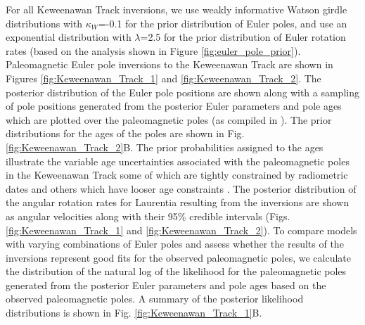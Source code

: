 \documentclass[]{agujournal2019}
\begin{document}
For all Keweenawan Track inversions, we use weakly informative Watson girdle distributions with $\kappa_W$=-0.1 for the prior distribution of Euler poles, and use an exponential distribution with $\lambda$=2.5 for the prior distribution of Euler rotation rates (based on the analysis shown in Figure \ref{fig:euler_pole_prior}). Paleomagnetic Euler pole inversions to the Keweenawan Track are shown in Figures \ref{fig:Keweenawan_Track_1} and \ref{fig:Keweenawan_Track_2}. The posterior distribution of the Euler pole positions are shown along with a sampling of pole positions generated from the posterior Euler parameters and pole ages which are plotted over the paleomagnetic poles (as compiled in ). The prior distributions for the ages of the poles are shown in Fig. \ref{fig:Keweenawan_Track_2}B. The prior probabilities assigned to the ages illustrate the variable age uncertainties associated with the paleomagnetic poles in the Keweenawan Track some of which are tightly constrained by radiometric dates and others which have looser age constraints \cite{Swanson-Hysell2019a}. The posterior distribution of the angular rotation rates for Laurentia resulting from the inversions are shown as angular velocities along with their 95\% credible intervals (Figs. \ref{fig:Keweenawan_Track_1} and \ref{fig:Keweenawan_Track_2}). To compare models with varying combinations of Euler poles and assess whether the results of the inversions represent good fits for the observed paleomagnetic poles, we calculate the distribution of the natural log of the likelihood for the paleomagnetic poles generated from the posterior Euler parameters and pole ages based on the observed paleomagnetic poles. A summary of the posterior likelihood distributions is shown in Fig. \ref{fig:Keweenawan_Track_1}B. 
\end{document}

